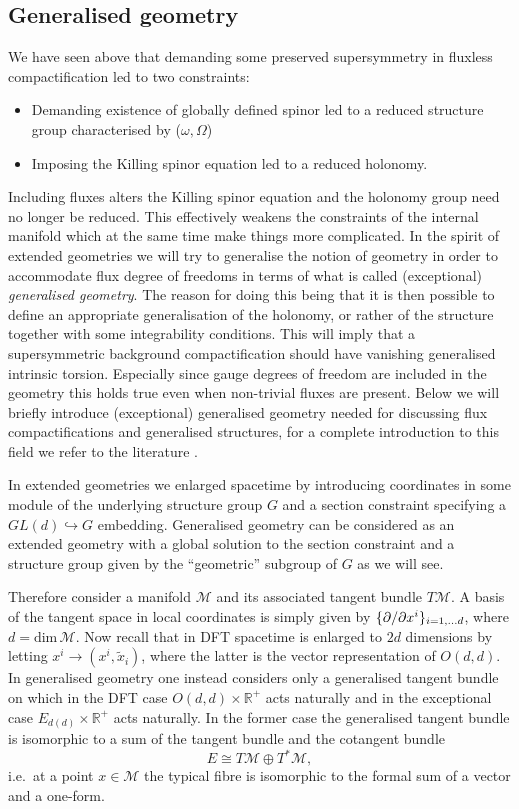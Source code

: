 \subsection{Generalised geometry}
We have seen above that demanding some preserved supersymmetry in fluxless compactification led to two constraints:
\begin{itemize}
    \item Demanding existence of globally defined spinor led to a reduced structure group characterised by ($\omega,\Omega$)
    \item Imposing the Killing spinor equation led to a reduced holonomy. 
\end{itemize}
Including fluxes alters the Killing spinor equation and the holonomy group need no longer be reduced. This effectively weakens the constraints of the internal manifold which at the same time make things more complicated. In the spirit of extended geometries we will try to generalise the notion of geometry in order to accommodate flux degree of freedoms in terms of what is called (exceptional) \emph{generalised geometry}. The reason for doing this being that it is then possible to define an appropriate generalisation of the holonomy, or rather of the structure together with some integrability conditions. This will imply that a supersymmetric background compactification should have vanishing generalised intrinsic torsion. Especially since gauge degrees of freedom are included in the geometry this holds true even when non-trivial fluxes are present. Below we will briefly introduce (exceptional) generalised geometry needed for discussing flux compactifications and generalised structures, for a complete introduction to this field we refer to the literature \cite{Hull:2007zu,Coimbra:2011nw,Coimbra:2011ky,Ntokos:2016vnm}.

In extended geometries we enlarged spacetime by introducing coordinates in some module of the underlying structure group $G$ and a section constraint specifying a $GL(d)\hookrightarrow G$ embedding. Generalised geometry can be considered as an extended geometry with a global solution to the section constraint and a structure group given by the ``geometric'' subgroup of $G$ as we will see.  

Therefore consider a manifold $\mathcal{M}$ and its associated tangent bundle $T\mathcal{M}$. A basis of the tangent space in local coordinates is simply given by $\{\partial/\partial x^i\}_{i=1,\ldots d}$, where $d=\text{dim}\,\mathcal{M}$. Now recall that in DFT spacetime is enlarged to $2d$ dimensions by letting $x^i\to (x^i,\tilde{x}_i)$, where the latter is the vector representation of $O(d,d)$. In generalised geometry one instead considers only a generalised tangent bundle on which in the DFT case $O(d,d)\times \mathbb{R}^+$ acts naturally and in the exceptional case $E_{d(d)}\times\mathbb{R}^+$ acts naturally.  In the former case the generalised tangent bundle is isomorphic to a sum of the tangent bundle and the cotangent bundle
\begin{equation}\label{eq:GenTangentBundleDef}
E \cong T\mathcal{M}\oplus T^*\mathcal{M},
\end{equation}
i.e.\ at a point $x\in\mathcal{M}$ the typical fibre is isomorphic to the formal sum of a vector and a one-form. 

